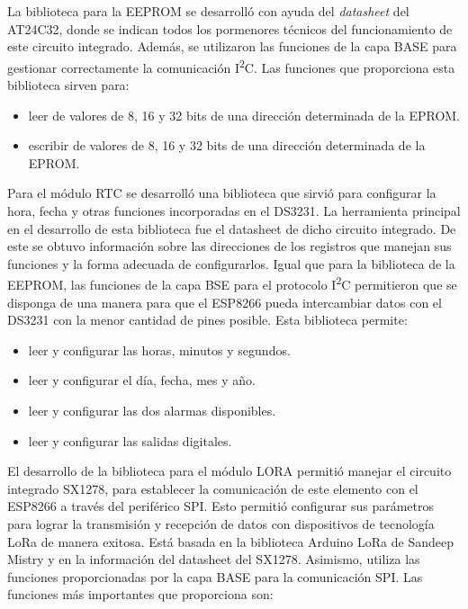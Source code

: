 La biblioteca para la EEPROM se desarrolló con ayuda del \textit{datasheet} \citep{WEBSITE:24} del AT24C32, donde se indican todos los pormenores técnicos del funcionamiento de este circuito integrado. Además, se utilizaron las funciones de la capa BASE para gestionar correctamente la comunicación I\textsuperscript{2}C. Las funciones que proporciona esta biblioteca sirven para:

\begin{itemize}
	\item leer de valores de 8, 16 y 32 bits de una dirección determinada de la EPROM.
	\item escribir de valores de 8, 16 y 32 bits de una dirección determinada de la EPROM.
\end{itemize}

Para el módulo RTC se desarrolló una biblioteca que sirvió para configurar la hora, fecha y otras funciones incorporadas en el DS3231. La herramienta principal en el desarrollo de esta biblioteca fue el datasheet \citep{WEBSITE:25} de dicho circuito integrado. De este se obtuvo información sobre las direcciones de los registros que manejan sus funciones y la forma adecuada de configurarlos. Igual que para la biblioteca de la EEPROM, las funciones de la capa BSE para el protocolo I\textsuperscript{2}C permitieron que se disponga de una manera para que el ESP8266 pueda intercambiar datos con el DS3231 con la menor cantidad de pines posible. Esta biblioteca permite:

\begin{itemize}
	\item leer y configurar las horas, minutos y segundos.
	\item leer y configurar el día, fecha, mes y año.
	\item leer y configurar las dos alarmas disponibles.
	\item leer y configurar las salidas digitales.
	
\end{itemize} 

El desarrollo de la biblioteca para el módulo LORA permitió manejar el circuito integrado SX1278, para establecer la comunicación de este elemento con el ESP8266 a través del periférico SPI. Esto permitió configurar sus parámetros para lograr la transmisión y recepción de datos con dispositivos de tecnología LoRa de manera exitosa. Está basada en la biblioteca Arduino LoRa de Sandeep Mistry \citep{WEBSITE:21} y en la información del datasheet \citep{WEBSITE:26} del SX1278. Asimismo, utiliza las funciones proporcionadas por la capa BASE para la comunicación SPI. Las funciones más importantes que proporciona son:

